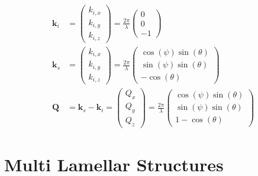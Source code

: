 \begin{align}
\mathbf{k}_i &=
    \left(
        \begin{array}{c}
                  k_{i,x} \\
                  k_{i,y} \\
                  k_{i,z}
        \end{array}
    \right)
    = \frac{2\pi}{\lambda}
    \left(
        \begin{array}{c}
                  0\\
                  0 \\
                  -1
        \end{array}
    \right) \\
\mathbf{k}_s &=
    \left(
        \begin{array}{c}
                  k_{i,x} \\
                  k_{i,y} \\
                  k_{i,z}
        \end{array}
    \right)
    = \frac{2\pi}{\lambda}
    \left(
        \begin{array}{c}
                  \cos(\psi) \sin(\theta)\\
                  \sin(\psi) \sin(\theta) \\
                  -\cos(\theta)
        \end{array}
    \right) \\
\mathbf{Q} &= \mathbf{k}_s - \mathbf{k}_i =
    \left(
        \begin{array}{c}
                  Q_{x} \\
                  Q_{y} \\
                  Q_{z}
        \end{array}
    \right)
    = \frac{2\pi}{\lambda}
    \left(
        \begin{array}{c}
                  \cos(\psi) \sin(\theta)\\
                  \sin(\psi) \sin(\theta) \\
                  1-\cos(\theta)
        \end{array}
    \right)
\end{align}



\clearpage
\section{Multi Lamellar Structures}

